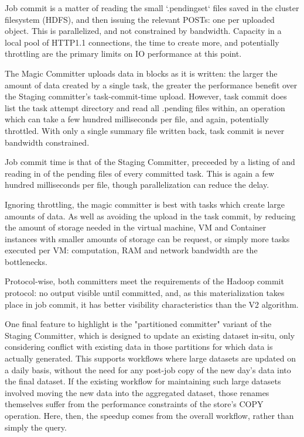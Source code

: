 \documentclass[conference]{IEEEtran}
\begin{document}
Job commit is a matter of reading the small `.pendingset` files saved in the
cluster filesystem (HDFS), and then issuing the relevant POSTs: one per uploaded
object.
This is parallelized, and not constrained by bandwidth.
Capacity in a local pool of HTTP1.1 connections, the time to create more,
and potentially throttling are the primary limits on IO performance at this point.

The Magic Committer uploads data in blocks as it is written: the larger
the amount of data created by a single task, the greater the performance
benefit over the Staging committer's task-commit-time upload.
However, task commit does list the task attempt directory and read all .pending
files within, an operation which can take a few hundred milliseconds per file,
and again, potentially throttled.
With only a single summary file written back, task commit is never
bandwidth constrained.

Job commit time is that of the Staging Committer, preceeded by a listing
of and reading in of the pending files of every committed task.
This is again a few hundred milliseconds per file, though parallelization
can reduce the delay.

Ignoring throttling, the magic committer is best with tasks which create
large amounts of data.
As well as avoiding the upload in the task commit, by reducing the
amount of storage needed in the virtual machine, VM and Container instances
with smaller amounts of storage can be request, or simply more tasks executed
per VM: computation, RAM and network bandwidth are the bottlenecks.

Protocol-wise, both committers meet the requirements of the Hadoop commit
protocol: no output visible until committed, and, as this materialization
takes place in job commit, it has better visibility characteristics than
the V2 algorithm.

One final feature to highlight is the "partitioned committer" variant
of the Staging Committer, which is designed to update an existing
dataset in-situ, only considering conflict with existing data in
those partitions for which data is actually generated.
This supports workflows where large datasets are updated on a daily basis,
without the need for any post-job copy of the new day's data into the
final dataset.
If the existing workflow for maintaining such large datasets involved
moving the new data into the aggregated dataset, those renames themselves
suffer from the performance constraints of the store's COPY operation.
Here, then, the speedup comes from the overall workflow, rather than
simply the query.
\end{document}
